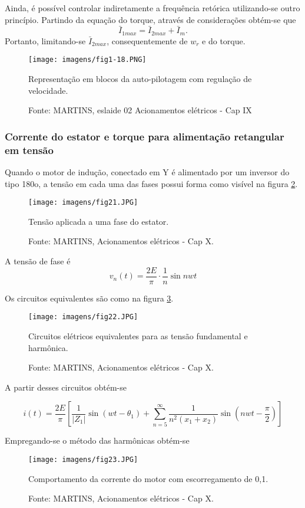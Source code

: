 Ainda, é possível controlar indiretamente a frequência retórica utilizando-se outro princípio. Partindo da equação do torque, através de considerações obtém-se que
\[\bar{I}_{1max} =  \bar{I}_{2max} + \bar{I}_{m}.\]
Portanto, limitando-se $\bar{I}_{2max}$, consequentemente de $w_{r}$ e do torque.

\begin{figure}[ht!]
\center
\texttt{[image: imagens/fig1-18.PNG]}
\caption{\label{fig:fig1-18}Representação em blocos da auto-pilotagem com regulação de velocidade.}
\caption*{Fonte: MARTINS, eslaide 02 Acionamentos elétricos - Cap IX}
\end{figure}

\subsubsection{Corrente do estator e torque para alimentação retangular em tensão}

Quando o motor de indução, conectado em Y é alimentado por um inversor do tipo 180o, a tensão em cada uma das fases possui forma como visível na figura \ref{fig:fig21}.

\begin{figure}[ht!]
\center
\texttt{[image: imagens/fig21.JPG]}
\caption{\label{fig:fig21}Tensão aplicada a uma fase do estator.}
\caption*{Fonte: MARTINS, Acionamentos elétricos - Cap X.}
\end{figure}

A tensão de fase é
\[ v_{n}(t) = \frac{2E}{\pi }\cdot \frac{1}{n} \sin{nwt} \]

Os circuitos equivalentes são como na figura \ref{fig:fig22}.

\begin{figure}[ht!]
\center
\texttt{[image: imagens/fig22.JPG]}
\caption{\label{fig:fig22}Circuitos elétricos equivalentes para as tensão fundamental e harmônica.}
\caption*{Fonte: MARTINS, Acionamentos elétricos - Cap X.}
\end{figure}

A partir desses circuitos obtém-se

\[ i(t) = \frac{2E}{\pi }\left [ \frac{1}{\left | Z_{1} \right |} \sin{(wt-\theta _{1})} + \sum_{n=5}^{\infty } \frac{1}{n^2(x_{1}+x_2)} \sin{\left ( nwt-\frac{\pi }{2} \right )} \right ] \]

Empregando-se o método das harmônicas obtém-se

\begin{figure}[ht!]
\center
\texttt{[image: imagens/fig23.JPG]}
\caption{\label{fig:fig23}Comportamento da corrente do motor com escorregamento de 0,1.}
\caption*{Fonte: MARTINS, Acionamentos elétricos - Cap X.}
\end{figure}

